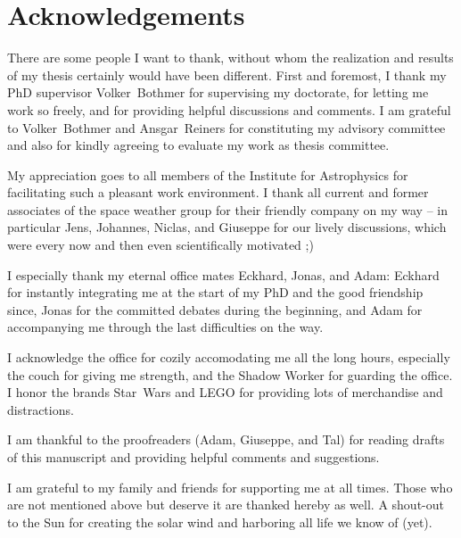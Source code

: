 
\chapter*{Acknowledgements}

There are some people I want to thank, without whom the realization and results of my thesis certainly would have been different.
First and foremost, I thank my PhD supervisor Volker~Bothmer for supervising my doctorate, for letting me work so freely, and for providing helpful discussions and comments.
I am grateful to Volker~Bothmer and Ansgar~Reiners for constituting my advisory committee and also for kindly agreeing to evaluate my work as thesis committee.

My appreciation goes to all members of the Institute for Astrophysics for facilitating such a pleasant work environment.
I thank all current and former associates of the space weather group for their friendly company on my way -- in particular Jens, Johannes, Niclas, and Giuseppe for our lively discussions, which were every now and then even scientifically motivated ;)

I especially thank my eternal office mates Eckhard, Jonas, and Adam:
Eckhard for instantly integrating me at the start of my PhD and the good friendship since,
Jonas for the committed debates during the beginning,
and Adam for accompanying me through the last difficulties on the way.

I acknowledge the office for cozily accomodating me all the long hours, especially the couch for giving me strength, and the Shadow Worker for guarding the office. I honor the brands Star~Wars and LEGO for providing lots of merchandise and distractions.

I am thankful to the proofreaders (Adam, Giuseppe, and Tal) for reading drafts of this manuscript and providing helpful comments and suggestions.

I am grateful to my family and friends for supporting me at all times.
Those who are not mentioned above but deserve it are thanked hereby as well.
A shout-out to the Sun for creating the solar wind and harboring all life we know of (yet).




